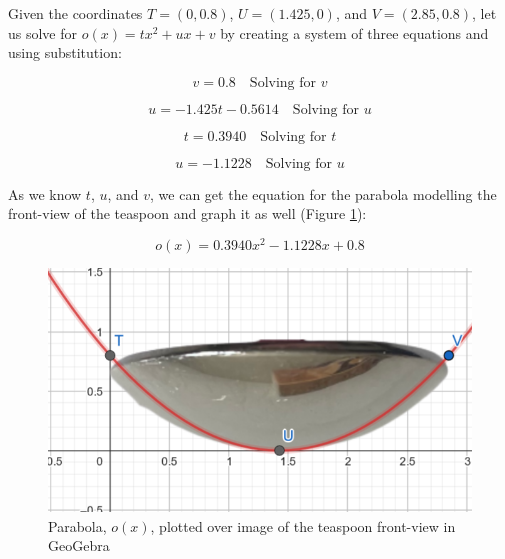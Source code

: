 \documentclass[12pt]{article}
\begin{document}
Given the coordinates $T=(0,0.8)$, $U=(1.425,0)$, and $V=(2.85,0.8)$, let us solve for $o(x)=tx^2+ux+v$ by creating a system of three equations and using substitution:

\begin{equation}\label{solve.v}
    \boxed{v = 0.8}  \quad \text{Solving for } v
\end{equation}

\begin{equation}\label{solve.u}
    \boxed{u = -1.425t -0.5614}  \quad \text{Solving for } u
\end{equation}

\begin{equation}\label{solve.t}
    \boxed{t = 0.3940}  \quad \text{Solving for } t
\end{equation}

\begin{equation}\label{solve.u2}
    \boxed{u = -1.1228}  \quad \text{Solving for } u
\end{equation}

As we know $t$, $u$, and $v$, we can get the equation for the parabola modelling the front-view of the teaspoon and graph it as well (Figure \ref{fig:fv tsp model}):

\begin{equation}\label{o(x)}
    \boxed{o(x)= 0.3940x^2 -1.1228 x +0.8}
\end{equation}

\begin{figure}[h]
    \centering
        \includegraphics[scale=0.45]{images/fv.tspcurve.png}
        \caption{Parabola, $o(x)$, plotted over image of the teaspoon front-view in GeoGebra}
    \label{fig:fv tsp model}
\end{figure}

\pagebreak
\end{document}
